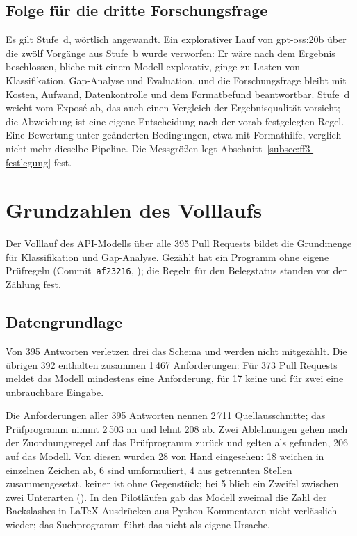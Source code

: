 \documentclass[11pt,a4paper]{report}
\begin{document}
\subsection{Folge für die dritte Forschungsfrage}
\label{subsec:pilot-folge}

Es gilt Stufe~d, wörtlich angewandt. Ein explorativer Lauf von
gpt-oss:20b über die zwölf Vorgänge aus Stufe~b wurde verworfen: Er
wäre nach dem Ergebnis beschlossen, bliebe mit einem Modell explorativ,
ginge zu Lasten von Klassifikation, Gap-Analyse und Evaluation, und die
Forschungsfrage bleibt mit Kosten, Aufwand, Datenkontrolle und dem
Formatbefund beantwortbar. Stufe~d weicht vom Exposé ab, das auch einen
Vergleich der Ergebnisqualität vorsieht; die Abweichung ist eine eigene
Entscheidung nach der vorab festgelegten Regel. Eine Bewertung unter
geänderten Bedingungen, etwa mit Formathilfe, verglich nicht mehr
dieselbe Pipeline. Die Messgrößen legt Abschnitt~\ref{subsec:ff3-festlegung}
fest.

\section{Grundzahlen des Volllaufs}
\label{sec:eval-grundzahlen}

Der Volllauf des API-Modells über alle 395 Pull Requests bildet die
Grundmenge für Klassifikation und Gap-Analyse. Gezählt hat ein Programm
ohne eigene Prüfregeln (Commit~\texttt{af23216},
); die
Regeln für den Belegstatus standen vor der Zählung fest.

\subsection{Datengrundlage}
\label{subsec:grundzahlen-daten}

Von 395 Antworten verletzen drei das Schema und werden nicht mitgezählt.
Die übrigen 392 enthalten zusammen 1\,467 Anforderungen: Für 373 Pull
Requests meldet das Modell mindestens eine Anforderung, für 17 keine und
für zwei eine unbrauchbare Eingabe.

Die Anforderungen aller 395 Antworten nennen 2\,711 Quellausschnitte; das
Prüfprogramm nimmt 2\,503 an und lehnt 208 ab. Zwei Ablehnungen gehen nach
der Zuordnungsregel auf das Prüfprogramm zurück und gelten als gefunden,
206 auf das Modell. Von diesen wurden 28 von Hand eingesehen: 18 weichen
in einzelnen Zeichen ab, 6 sind umformuliert, 4 aus getrennten Stellen
zusammengesetzt, keiner ist ohne Gegenstück; bei 5 blieb ein Zweifel
zwischen zwei Unterarten (). In den
Pilotläufen gab das Modell zweimal die Zahl der Backslashes in
LaTeX-Ausdrücken aus Python-Kommentaren nicht verlässlich wieder; das
Suchprogramm führt das nicht als eigene Ursache.
\end{document}
